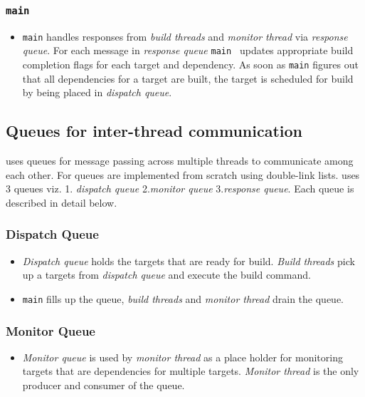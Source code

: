 \documentclass[12pt,letterpaper,titlepage, one-sided]{article}
\begin{document}
		\subsubsection{\texttt{main}}
		\begin{itemize}
		\item
		\texttt{main} handles responses from \textit{build threads} and \textit{monitor thread} via \textit{response queue}. For each message in \textit{response queue} \texttt{main } updates appropriate build completion flags for each target and dependency. As soon as \texttt{main} figures out that all dependencies for a target are built, the target is scheduled for build by being placed in \textit{dispatch queue}.  
		\end{itemize}
		
		\subsection{Queues for inter-thread communication}
		\remodel uses queues for message passing across multiple threads to communicate among each other. For \remodel queues are implemented from scratch using double-link lists. \remodel uses 3 queues viz. 1. \textit{dispatch queue} 2.\textit{monitor queue} 3.\textit{response queue}. Each queue is described in detail below.
		\subsubsection{Dispatch Queue}
		\begin{itemize}
		\item
		\textit{Dispatch queue} holds the targets that are ready for build. \textit{Build threads} pick up a targets from \textit{dispatch queue }and execute the build command.
		
		\item
		\texttt{main} fills up the queue, \textit{build threads} and \textit{monitor thread} drain the queue.
		\end{itemize}
		
		\subsubsection{Monitor Queue}
		\begin{itemize}
		\item
		\textit{Monitor queue} is used by \textit{monitor thread} as a place holder for monitoring targets that are dependencies for multiple targets. \textit{Monitor thread} is the only producer and consumer of the queue.
		\end{itemize}
		
\end{document}
